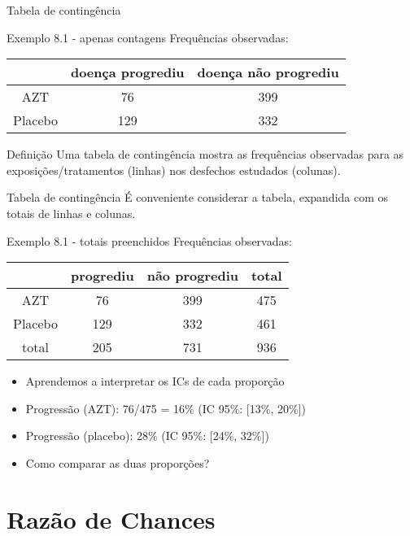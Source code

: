 \documentclass{beamer}
\begin{document}
\begin{frame}{\scriptsize Tabela de contingência}
  \begin{exampleblock}{Exemplo 8.1 - apenas contagens}
    \footnotesize
    Frequências observadas:
    \begin{tabular}{c|c|c}
      & doença progrediu & doença não progrediu\\
      \hline
      AZT & 76 & 399 \\
      \hline
      Placebo & 129 & 332 \\
    \end{tabular}
  \end{exampleblock}
  \begin{block}{Definição}
    \footnotesize
    Uma \alert{tabela de contingência} mostra as frequências
    observadas para as exposições/tratamentos (linhas) nos desfechos estudados (colunas).
  \end{block}
\end{frame}

\begin{frame}{\scriptsize Tabela de contingência}
  É conveniente considerar a tabela, expandida com os totais de linhas e colunas.
    \begin{exampleblock}{Exemplo 8.1 - totais preenchidos}
    \footnotesize
    Frequências observadas:
    \begin{tabular}{c|c|c|c}
      & progrediu & não progrediu & total\\
      \hline
      AZT & 76 & 399 & 475\\
      \hline
      Placebo & 129 & 332 & 461\\
      \hline
      total & 205 & 731 & 936\\
    \end{tabular}
  \end{exampleblock}
  \begin{itemize}
    \footnotesize
  \item Aprendemos a interpretar os ICs de cada proporção
  \item Progressão (AZT): 76/475 = 16\% (IC 95\%: [13\%, 20\%])
  \item Progressão (placebo): 28\% (IC 95\%: [24\%, 32\%])
  \item Como comparar as duas proporções?
  \end{itemize}
\end{frame}

\section{Razão de Chances}
\end{document}
